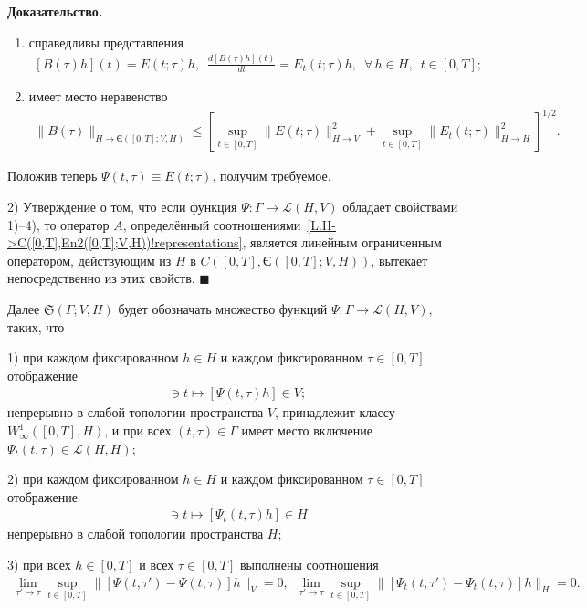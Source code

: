 \documentclass{report}
\newenvironment{Proof}{\par\noindent\bf Доказательство.\rm}{ $\blacksquare$\par}
\begin{document}
\begin{Proof}
{\begin{enumerate}
\item справедливы представления
\begin{gather}\label{L.H->C([0,T],En2([0,T];V,H))!B(tau).representation}
[B(\tau)h](t)=E(t;\tau)h,\,\,\,\frac{d[B(\tau)h](t)}{dt}=E_t(t;\tau)h,\,\,\,\forall\,h\in H,\,\,\,t\in[0,T];
\end{gather}

\item имеет место неравенство
\begin{gather}\label{L.H->C([0,T],En2([0,T];V,H))!B(tau).norm}
\|B(\tau)\|_{H\to\textrm{Є}([0,T];V,H)}\leqslant[\sup\limits_{t\in[0,T]}\|E(t;\tau)\|^2_{H\to V}+\sup\limits_{t\in[0,T]}\|E_t(t;\tau)\|^2_{H\to H}]^{1/2}.
\end{gather}
\end{enumerate}
}

Положив теперь $\Psi(t,\tau)\equiv E(t;\tau)$, получим требуемое.

2) Утверждение о том, что если функция $\Psi:\Gamma\to\mathcal{L}(H,V)$ обладает свойствами 1)--4), то оператор $A$, определённый соотношениями~\eqref{L.H->C([0,T],En2([0,T];V,H))!representations}, является линейным ограниченным оператором, действующим из $H$ в $C([0,T],\textrm{Є}([0,T];V,H))$, вытекает непосредственно из этих свойств.
\end{Proof}

Далее $\mathfrak{S}(\Gamma;V,H)$ будет обозначать множество функций $\Psi:\Gamma\to\mathcal{L}(H,V)$, таких, что

1)  при каждом фиксированном $h\in H$ и каждом фиксированном $\tau\in[0,T]$ отображение
\begin{gather*}
[0,T]\ni t\mapsto[\Psi(t,\tau)h]\in V;
\end{gather*}
непрерывно в слабой топологии пространства $V$, принадлежит классу  $W^1_\infty([0,T],H)$,  и при всех $(t,\tau)\in\Gamma$ имеет место включение  $\Psi_t(t,\tau)\in\mathcal{L}(H,H)$; 

2) при каждом фиксированном $h\in H$ и каждом фиксированном $\tau\in[0,T]$ отображение
\begin{gather*}
[0,T]\ni t\mapsto[\Psi_t(t,\tau)h]\in H
\end{gather*}
непрерывно в слабой топологии пространства $H$;

3) при всех $h\in[0,T]$ и всех $\tau\in[0,T]$ выполнены соотношения
\begin{gather*}
\lim\limits_{\tau'\to\tau}\sup\limits_{t\in[0,T]}\|[\Psi(t,\tau')-\Psi(t,\tau)]h\|_V=0,\,\,\,
\lim\limits_{\tau'\to\tau}\sup\limits_{t\in[0,T]}\|[\Psi_t(t,\tau')-\Psi_t(t,\tau)]h\|_H=0.
\end{gather*}
\end{document}

